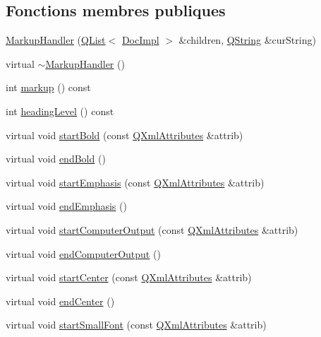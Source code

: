 \subsection*{Fonctions membres publiques}
\begin{DoxyCompactItemize}
\item 
\hyperlink{class_markup_handler_a2779b00d597b8e3dc4bc0492a4e31c02}{Markup\+Handler} (\hyperlink{class_q_list}{Q\+List}$<$ \hyperlink{class_doc_impl}{Doc\+Impl} $>$ \&children, \hyperlink{class_q_string}{Q\+String} \&cur\+String)
\item 
virtual \hyperlink{class_markup_handler_a0ebe3dfc2737c578e9895d9e36fc0c2f}{$\sim$\+Markup\+Handler} ()
\item 
int \hyperlink{class_markup_handler_aa219e46d2a72d61550406e7af5007b7a}{markup} () const 
\item 
int \hyperlink{class_markup_handler_a5df8854fa44794d07ea4fcc842ac4d25}{heading\+Level} () const 
\item 
virtual void \hyperlink{class_markup_handler_afca0a2b1078d41b5031b1562b2674b42}{start\+Bold} (const \hyperlink{class_q_xml_attributes}{Q\+Xml\+Attributes} \&attrib)
\item 
virtual void \hyperlink{class_markup_handler_ade017bb597346494bd6da7d7642ea33b}{end\+Bold} ()
\item 
virtual void \hyperlink{class_markup_handler_ac1bfec64b91df892213a65ba45d0e87f}{start\+Emphasis} (const \hyperlink{class_q_xml_attributes}{Q\+Xml\+Attributes} \&attrib)
\item 
virtual void \hyperlink{class_markup_handler_a2a1613f12a7661c9555d679ca29264eb}{end\+Emphasis} ()
\item 
virtual void \hyperlink{class_markup_handler_a471c0bdb52b752560c8e398f0184a6bb}{start\+Computer\+Output} (const \hyperlink{class_q_xml_attributes}{Q\+Xml\+Attributes} \&attrib)
\item 
virtual void \hyperlink{class_markup_handler_a4041d6dcad8e3e3d7abb53b89b1471f2}{end\+Computer\+Output} ()
\item 
virtual void \hyperlink{class_markup_handler_acfd5b3daf72a1ebb3232e64740da37c6}{start\+Center} (const \hyperlink{class_q_xml_attributes}{Q\+Xml\+Attributes} \&attrib)
\item 
virtual void \hyperlink{class_markup_handler_a8fe6abf006123e01d33f8fc66154a2f0}{end\+Center} ()
\item 
virtual void \hyperlink{class_markup_handler_a31e9c776ff9091c985f37ff1523886d2}{start\+Small\+Font} (const \hyperlink{class_q_xml_attributes}{Q\+Xml\+Attributes} \&attrib)

\end{DoxyCompactItemize}
